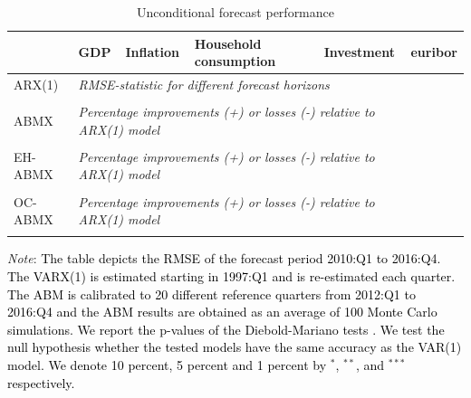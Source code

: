 \begin{table}[!h]
	\caption{Unconditional forecast performance } 
	\label{table:rmse_ed_abmx}
	\centering
		\begin{tabular}{llllll}
			\toprule
			& GDP & Inflation & Household consumption & Investment & euribor\\
			\midrule
			ARX(1) & \multicolumn{4}{l}{\textit{RMSE-statistic for different forecast horizons}} \\ \midrule
			 \\ \midrule
           ABMX & \multicolumn{4}{l}{\textit{Percentage improvements (+) or losses (-) relative to ARX(1) model}} \\ \midrule
           	 \\ \midrule
           EH-ABMX & \multicolumn{4}{l}{\textit{Percentage improvements (+) or losses (-) relative to ARX(1) model}} \\ \midrule
			 \\ \midrule
			OC-ABMX & \multicolumn{4}{l}{\textit{Percentage improvements (+) or losses (-) relative to ARX(1) model}} \\ \midrule
			
			\\ \bottomrule
		\end{tabular}
	\begin{tablenotes}
		\footnotesize \item \textit{Note}: \textcolor{black}{The table depicts the RMSE of the forecast period 2010:Q1 to 201\textcolor{black}{6}:Q4. The VARX(1) is estimated starting in 1997:Q1 and is re-estimated each quarter. The ABM is calibrated to \textcolor{black}{20} different reference quarters from 2012:Q1 to \textcolor{black}{2016:Q4} and the ABM results are obtained as an average of 100 Monte Carlo simulations. We report the p-values of the Diebold-Mariano tests \citep{harveyTestingEqualityPrediction1997}.  We test the null hypothesis whether the tested models have the same accuracy as the VAR(1) model. We denote  10 percent, 5 percent and 1 percent by $^{*}$, $^{**}$, and $^{***}$ respectively.}
	\end{tablenotes}
\end{table}

